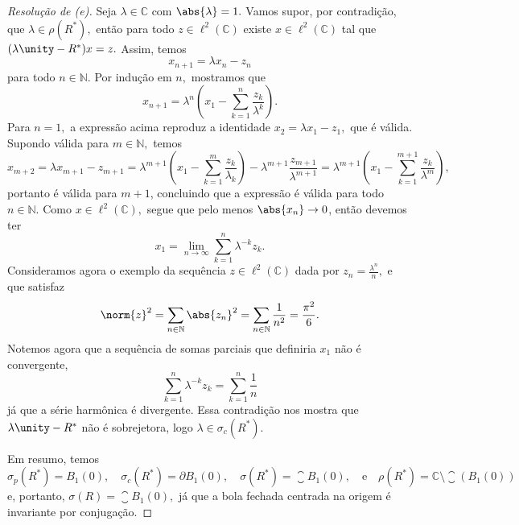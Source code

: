 \begin{proof}[Resolução de (e)]
  Seja \(\lambda \in \mathbb{C}\) com \(\abs{\lambda} = 1.\) Vamos supor, por contradição, que \(\lambda \in \rho(R^*),\) então para todo \(z \in \ell^2(\mathbb{C})\) existe \(x \in \ell^2(\mathbb{C})\) tal que \((\lambda \unity - R^*)x = z.\) Assim, temos
  \begin{equation*}
    x_{n+1} = \lambda x_n - z_n
  \end{equation*}
  para todo \(n \in \mathbb{N}.\) Por indução em \(n,\) mostramos que
  \begin{equation*}
    x_{n+1} = \lambda^n \left(x_1 - \sum_{k = 1}^{n}{\frac{z_k}{\lambda^k}}\right).
  \end{equation*}
  Para \(n = 1,\) a expressão acima reproduz a identidade \(x_2 = \lambda x_1 - z_1,\) que é válida. Supondo válida para \(m \in \mathbb{N},\) temos
  \begin{equation*}
    x_{m+2} = \lambda x_{m+1} - z_{m+1} = \lambda^{m+1}\left(x_1 - \sum_{k = 1}^{m}{\frac{z_k}{\lambda_k}}\right) - \lambda^{m+1}\frac{z_{m+1}}{\lambda^{m+1}} = \lambda^{m+1}\left(x_1 - \sum_{k=1}^{m+1}{\frac{z_k}{\lambda^m}}\right),
  \end{equation*}
  portanto é válida para \(m+1\), concluindo que a expressão é válida para todo \(n \in \mathbb{N}.\) Como \(x \in \ell^2(\mathbb{C}),\) segue que pelo menos \(\abs{x_n} \to 0\), então devemos ter
  \begin{equation*}
    x_1 = \lim_{n \to \infty}{\sum_{k = 1}^{n}{\lambda^{-k} z_k}}.
  \end{equation*}
  Consideramos agora o exemplo da sequência \(z \in \ell^2(\mathbb{C})\) dada por \(z_n = \frac{\lambda^n}{n},\) e que satisfaz
  \begin{equation*}
    \norm{z}^2 = \sum_{n \in \mathbb{N}}{\abs{z_n}^2} = \sum_{n \in \mathbb{N}}{\frac{1}{n^2}} = \frac{\pi^2}{6}.
  \end{equation*}
  Notemos agora que a sequência de somas parciais que definiria \(x_1\) não é convergente,
  \begin{equation*}
    \sum_{k = 1}^{n}{\lambda^{-k}z_k} = \sum_{k = 1}^{n}{\frac{1}{n}}
  \end{equation*}
  já que a série harmônica é divergente. Essa contradição nos mostra que \(\lambda \unity - R^*\) não é sobrejetora, logo \(\lambda \in \sigma_c(R^*).\)

  Em resumo, temos
  \begin{equation*}
    \sigma_p(R^*) = B_1(0),\quad
    \sigma_c(R^*) = \partial B_1(0),\quad
    \sigma(R^*) = \closure{B_1(0)},\quad\text{e}\quad
    \rho(R^*) = \mathbb{C} \setminus \closure{(B_1(0))}
  \end{equation*}
  e, portanto, \(\sigma(R) = \closure{B_1(0)},\) já que a bola fechada centrada na origem é invariante por conjugação.
\end{proof}
